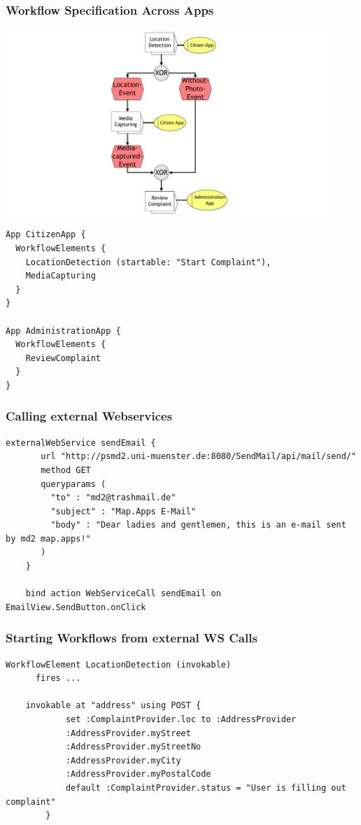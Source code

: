 \begin{frame}
	\plainnumber
	\frametitle{Workflow Specification Across Apps}
	
	\begin{minipage}{0.45\textwidth}
	    		        \includegraphics[height = 7cm, trim = 10cm 0cm 10cm 0cm, clip = true]{images/wfAcrossApps}	  
	\end{minipage}\hfill
	\begin{minipage}{0.5\textwidth}
\begin{lstlisting}
App CitizenApp {
  WorkflowElements {
    LocationDetection (startable: "Start Complaint"),
    MediaCapturing
  }
}

App AdministrationApp {
  WorkflowElements {
    ReviewComplaint
  }
}
\end{lstlisting}
\end{minipage}

\end{frame}


\begin{frame}[fragile]
	\frametitle{Calling external Webservices}
	\begin{lstlisting}[basicstyle=\footnotesize]
	externalWebService sendEmail {
	   url "http://psmd2.uni-muenster.de:8080/SendMail/api/mail/send/"
	   method GET
	   queryparams (
	     "to" : "md2@trashmail.de"
	     "subject" : "Map.Apps E-Mail"
	     "body" : "Dear ladies and gentlemen, this is an e-mail sent by md2 map.apps!"
	   )
	}
	
	bind action WebServiceCall sendEmail on EmailView.SendButton.onClick
	\end{lstlisting}
\end{frame}

\begin{frame}[fragile]
	\frametitle{Starting Workflows from external WS Calls}
	\begin{lstlisting}[basicstyle=\footnotesize]
	WorkflowElement LocationDetection (invokable)
	  fires ...
		
	invokable at "address" using POST {
			set :ComplaintProvider.loc to :AddressProvider
			:AddressProvider.myStreet
			:AddressProvider.myStreetNo
			:AddressProvider.myCity
			:AddressProvider.myPostalCode
			default :ComplaintProvider.status = "User is filling out complaint" 
		}
	\end{lstlisting}
\end{frame}



